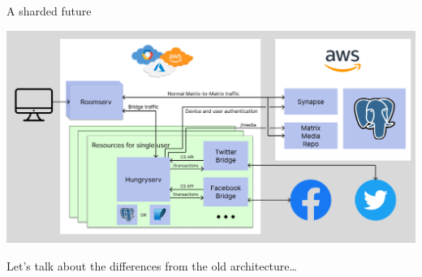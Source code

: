 \documentclass{beeper}
\begin{document}



\begin{frame}{A sharded future}
    \centerline{\includegraphics[width=1.15\textwidth]{images/new-architecture}}

    Let's talk about the differences from the old architecture\ldots
\end{frame}
\end{document}
